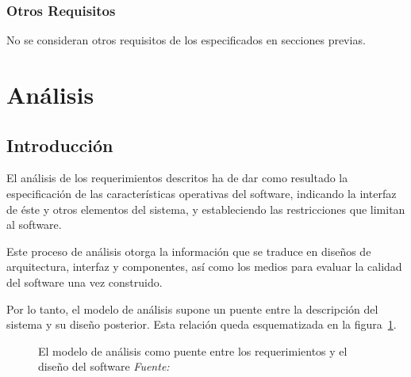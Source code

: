 \subsubsection{Otros Requisitos}

No se consideran otros requisitos de los especificados en secciones previas.



\section{Análisis}
\label{sec:secModeloAn}

\subsection{Introducción}

El análisis de los requerimientos descritos ha de dar como resultado la especificación de las características operativas del software, indicando la interfaz de éste y otros elementos del sistema, y estableciendo las restricciones que limitan al software.

Este proceso de análisis otorga la información que se traduce en diseños de arquitectura, interfaz y componentes, así como los medios para evaluar la calidad del software una vez construido. 

Por lo tanto, el modelo de análisis supone un puente entre la descripción del sistema y su diseño posterior. Esta relación queda esquematizada en la figura~\ref{fig:modeloAnalisis}.

\begin{figure}
	\centering
	\caption{El modelo de análisis como puente entre los requerimientos y el diseño del software \textit{Fuente:~\cite{Pre10}}}
	\label{fig:modeloAnalisis}
\end{figure}

